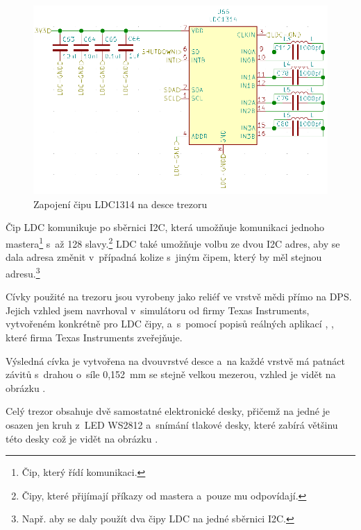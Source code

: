 \begin{figure}[h]
    \centering
    \includegraphics[width=\textwidth]{kapitoly/obrazky/E4/elektronika_tlakove_desky/moje_zapojeni.png}
    \caption{Zapojení čipu LDC1314 na desce trezoru}
    \label{fig:E4-LDC}
\end{figure}

Čip LDC komunikuje po sběrnici I2C, která umožňuje komunikaci jednoho mastera\footnote{Čip, který řídí komunikaci.} s~až 128 slavy.\footnote{Čipy, které přijímají příkazy od mastera a~pouze mu odpovídají.} LDC také umožňuje volbu ze dvou I2C adres, aby se dala adresa změnit v~případná 
kolize s~jiným čipem, který by měl stejnou adresu.\footnote{Např. aby se daly použít dva čipy LDC na jedné sběrnici I2C.}

Cívky použité na trezoru jsou vyrobeny jako reliéf ve vrstvě mědi přímo na DPS. Jejich vzhled jsem navrhoval v~simulátoru od firmy Texas Instruments, 
vytvořeném konkrétně pro LDC čipy, a~s~pomocí popisů reálných aplikací \parencite{LDC-cd0}, \parencite{LDC-cd1}, které firma Texas Instruments zveřejňuje.


Výsledná cívka je vytvořena na dvouvrstvé desce a~na každé vrstvě má patnáct závitů s~drahou o~síle 0,152~mm se stejně velkou mezerou, 
vzhled je vidět na obrázku .

\enlargethispage{5mm}
Celý trezor obsahuje dvě samostatné elektronické desky, přičemž na jedné je osazen jen kruh z~LED WS2812 a~snímání tlakové desky, které zabírá 
většinu této desky což je vidět na obrázku .